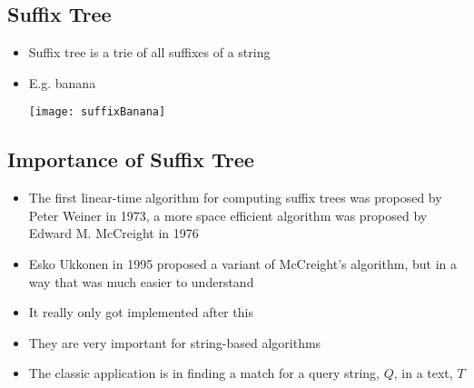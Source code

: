 \Outline %
\begin{slide}
\section[-1]{Suffix Tree}

\begin{PauseHighLight}
  \begin{itemize}
  \item Suffix tree is a trie of all suffixes of a string\pause
  \item E.g. banana
    \begin{center}
      \texttt{[image: suffixBanana]}\pause
    \end{center}
  \end{itemize}
\end{PauseHighLight}
\end{slide}


\begin{slide}
\section{Importance of Suffix Tree}

\begin{PauseHighLight}
  \begin{itemize}
  \item The first linear-time algorithm for computing suffix trees was
    proposed by Peter Weiner in 1973, a more space efficient algorithm
    was proposed by Edward M. McCreight in 1976\pause
  \item Esko Ukkonen in 1995 proposed a variant of McCreight's
    algorithm, but in a way that was much easier to understand\pause
  \item It really only got implemented after this\pause
  \item They are very important for string-based algorithms\pause
  \item The classic application is in finding a match for a query
    string, $Q$, in a text, $T$\pause
  \end{itemize}
\end{PauseHighLight}

\end{slide}

